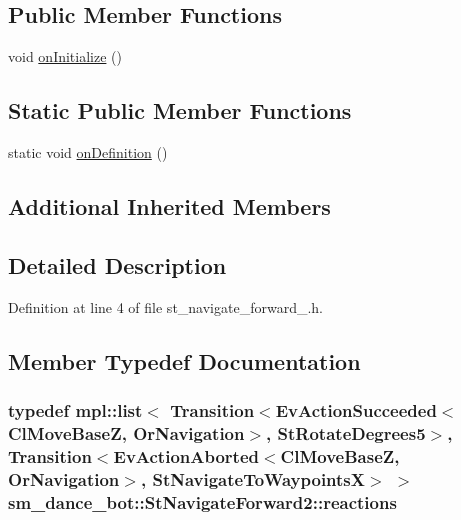 \subsection*{Public Member Functions}
\begin{DoxyCompactItemize}
\item 
void \hyperlink{structsm__dance__bot_1_1StNavigateForward2_a94ba42076162a9276a6654b057b7c36d}{on\+Initialize} ()
\end{DoxyCompactItemize}
\subsection*{Static Public Member Functions}
\begin{DoxyCompactItemize}
\item 
static void \hyperlink{structsm__dance__bot_1_1StNavigateForward2_acf2394745adca290c9e3a8ff03a8618d}{on\+Definition} ()
\end{DoxyCompactItemize}
\subsection*{Additional Inherited Members}


\subsection{Detailed Description}


Definition at line 4 of file st\+\_\+navigate\+\_\+forward\+\_.\+h.



\subsection{Member Typedef Documentation}
\subsubsection[{\texorpdfstring{reactions}{reactions}}]{\setlength{\rightskip}{0pt plus 5cm}typedef mpl\+::list$<$ Transition$<$Ev\+Action\+Succeeded$<${\bf Cl\+Move\+BaseZ}, {\bf Or\+Navigation}$>$, {\bf St\+Rotate\+Degrees5}$>$, Transition$<$Ev\+Action\+Aborted$<${\bf Cl\+Move\+BaseZ}, {\bf Or\+Navigation}$>$, {\bf St\+Navigate\+To\+WaypointsX}$>$ $>$ {\bf sm\+\_\+dance\+\_\+bot\+::\+St\+Navigate\+Forward2\+::reactions}}\hypertarget{structsm__dance__bot_1_1StNavigateForward2_ac9a6d0e0aa772d68bcb6d7932a21463a}{}\label{structsm__dance__bot_1_1StNavigateForward2_ac9a6d0e0aa772d68bcb6d7932a21463a}


